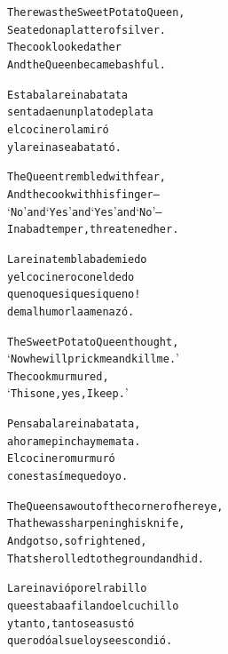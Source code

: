 \documentclass[11pt]{article}
\begin{document}
\begin{parcolumns}{2}

\colchunk
{
\begin{alltt}\normalfont
There was the Sweet Potato Queen,
Seated on a platter of silver.
The cook looked at her
And the Queen became bashful.
\end{alltt}
}

\colchunk
{
\begin{alltt}\normalfont
Estaba la reina batata
sentada en un plato de plata
el cocinero la miró
y la reina se abatató.
\end{alltt}
}

\colplacechunks

\colchunk
{
\begin{alltt}\normalfont
The Queen trembled with fear,
And the cook with his finger –
‘No’ and ‘Yes’ and ‘Yes’ and ‘No’ –
In a bad temper, threatened her.
\end{alltt}
}

\colchunk
{
\begin{alltt}\normalfont
La reina temblaba de miedo
y el cocinero con el dedo
que no que si que si que no!
de mal humor la amenazó.
\end{alltt}
}

\colplacechunks

\colchunk
{
\begin{alltt}\normalfont
The Sweet Potato Queen thought,
‘Now he will prick me and kill me.’
The cook murmured,
‘This one, yes, I keep.’
\end{alltt}
}

\colchunk
{
\begin{alltt}\normalfont
Pensaba la reina batata,
ahora me pincha y me mata.
El cocinero murmuró
con esta sí me quedo yo.
\end{alltt}
}

\colplacechunks

\colchunk
{
\begin{alltt}\normalfont
The Queen saw out of the corner of her eye,
That he was sharpening his knife,
And got so, so frightened,
That she rolled to the ground and hid.
\end{alltt}
}

\colchunk
{
\begin{alltt}\normalfont
La reina vió por el rabillo
que estaba afilando el cuchillo
y tanto, tanto se asustó
que rodó al suelo y se escondió.
\end{alltt}
}

\colplacechunks


\end{parcolumns}
\end{document}

